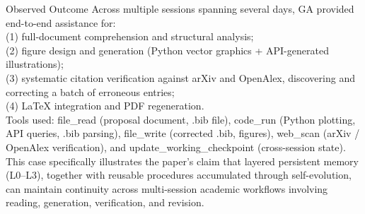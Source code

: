 \begin{CaseAnswerBox}{Observed Outcome}
\small\ttfamily
Across multiple sessions spanning several days, GA provided end-to-end assistance for: \\
(1) full-document comprehension and structural analysis; \\
(2) figure design and generation (Python vector graphics + API-generated illustrations); \\
(3) systematic citation verification against arXiv and OpenAlex, discovering and correcting a batch of erroneous entries; \\
(4) LaTeX integration and PDF regeneration. \\[4pt]
Tools used: file\_read (proposal document, .bib file), code\_run (Python plotting, API queries, .bib parsing), file\_write (corrected .bib, figures), web\_scan (arXiv / OpenAlex verification), and update\_working\_checkpoint (cross-session state). \\[4pt]
This case specifically illustrates the paper's claim that layered persistent memory (L0--L3), together with reusable procedures accumulated through self-evolution, can maintain continuity across multi-session academic workflows involving reading, generation, verification, and revision.
\end{CaseAnswerBox}

\FloatBarrier
